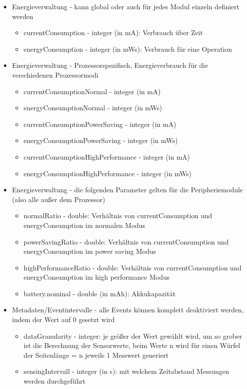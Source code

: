 \begin{itemize}
\item Energieverwaltung - kann global oder auch für jedes Modul einzeln definiert werden
\begin{itemize}
\item currentConsumption - integer (in mA): Verbrauch über Zeit
\item energyConsumption - integer (in mWs): Verbrauch für eine Operation
\end{itemize}
\item Energieverwaltung - Prozessorspezifisch, Energieverbrauch für die verschiedenen Prozessormodi
\begin{itemize}
\item currentConsumptionNormal - integer (in mA)
\item energyConsumptionNormal - integer (in mWs)
\item currentConsumptionPowerSaving - integer (in mA)
\item energyConsumptionPowerSaving - integer (in mWs)
\item currentConsumptionHighPerformance - integer (in mA)
\item energyConsumptionHighPerformance - integer (in mWs)
\end{itemize}
\item Energieverwaltung - die folgenden Parameter gelten für die Peripheriemodule (also alle außer dem Prozessor)
\begin{itemize}
\item normalRatio - double: Verhältnis von currentConsumption und energyConsumption im normalen Modus
\item powerSavingRatio - double: Verhältnis von currentConsumption und energyConsumption im power saving Modus
\item highPerformanceRatio - double: Verhältnis von currentConsumption und energyConsumption im high performance Modus
\item battery.nominal - double (in mAh): Akkukapazität
\end{itemize}
\item Metadaten/Eventintervalle - alle Events können komplett deaktiviert werden, indem der Wert auf 0 gesetzt wird
\begin{itemize}
\item dataGranularity - integer: je größer der Wert gewählt wird, um so grober ist die Berechnung der Sensorwerte, beim Werte n wird für einen Würfel der Seitenlänge = n jeweils 1 Messwert generiert
\item sensingIntervall - integer (in s): mit welchem Zeitabstand Messungen werden durchgeführt

\end{itemize}
\end{itemize}
